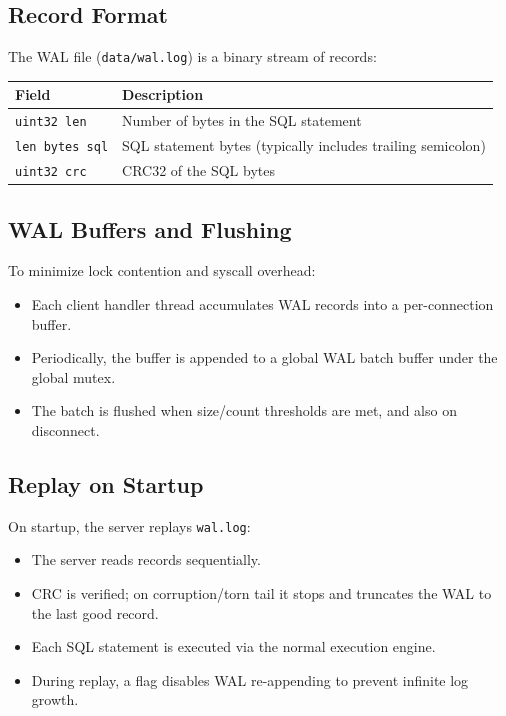 \documentclass[11pt]{article}
\begin{document}
\subsection{Record Format}
The WAL file (\texttt{data/wal.log}) is a binary stream of records:

\begin{longtable}{@{}ll@{}}
\toprule
Field & Description\\
\midrule
\texttt{uint32 len} & Number of bytes in the SQL statement\\
\texttt{len bytes sql} & SQL statement bytes (typically includes trailing semicolon)\\
\texttt{uint32 crc} & CRC32 of the SQL bytes\\
\bottomrule
\end{longtable}

\subsection{WAL Buffers and Flushing}
To minimize lock contention and syscall overhead:

\begin{itemize}[leftmargin=*]
\item Each client handler thread accumulates WAL records into a per-connection buffer.
\item Periodically, the buffer is appended to a global WAL batch buffer under the global mutex.
\item The batch is flushed when size/count thresholds are met, and also on disconnect.
\end{itemize}

\subsection{Replay on Startup}
On startup, the server replays \texttt{wal.log}:

\begin{itemize}[leftmargin=*]
\item The server reads records sequentially.
\item CRC is verified; on corruption/torn tail it stops and truncates the WAL to the last good record.
\item Each SQL statement is executed via the normal execution engine.
\item During replay, a flag disables WAL re-appending to prevent infinite log growth.
\end{itemize}
\end{document}
